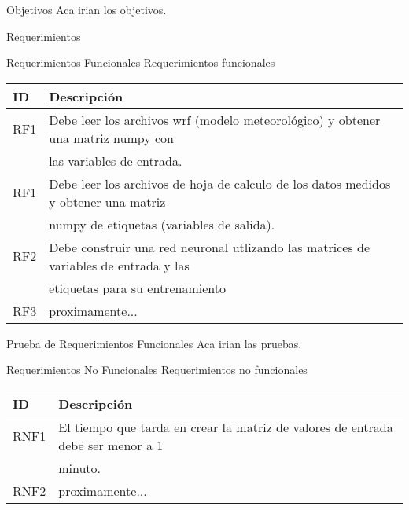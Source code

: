 \documentclass{scrartcl}
\begin{document}
		\cleardoublepage

		\begin{subsection}{Objetivos}
			Aca irian los objetivos.
		\end{subsection}

		\begin{subsection}{Requerimientos}
			\begin{subsubsection}{Requerimientos Funcionales}
				Requerimientos funcionales
				\begin{table}[h]
					\begin{tabular}{|l|l|}
					\hline
					ID  & Descripción \\ \hline \hline
					RF1 & Debe leer los archivos wrf (modelo meteorológico) y obtener una matriz numpy con \\& las variables 
						  de entrada.\\ \hline
					RF1 & Debe leer los archivos de hoja de calculo de los datos medidos y obtener una matriz \\& numpy de 
						  etiquetas (variables de salida).\\ \hline
					RF2 & Debe construir una red neuronal utlizando las matrices de variables de entrada y las \\& etiquetas 
						  para su entrenamiento\\ \hline
					RF3 & proximamente...\\ \hline
					\end{tabular}
					\end{table}
				\begin{paragraph}{Prueba de Requerimientos Funcionales}
					Aca irian las pruebas.
				\end{paragraph}				
			\end{subsubsection}

			\begin{subsubsection}{Requerimientos No Funcionales}
				Requerimientos no funcionales
				\begin{table}[h]
					\begin{tabular}{|l|l|}
					\hline
					ID   & Descripción \\ \hline \hline
					RNF1 & El tiempo que tarda en crear la matriz de valores de entrada debe ser menor a 1 \\& minuto.\\ \hline
					RNF2 & proximamente...\\ \hline
					\end{tabular}
				\end{table}
			\end{subsubsection}
		\end{subsection}
\end{document}
